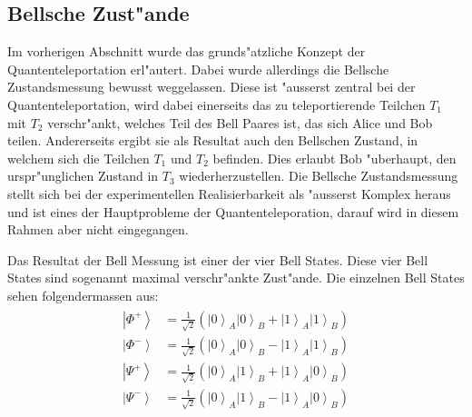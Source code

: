 \begin{refsection}
\subsection{Bellsche Zust"ande}\label{sec:bell-states}
Im vorherigen Abschnitt wurde das grunds"atzliche Konzept der Quantenteleportation erl"autert. Dabei wurde allerdings die Bellsche Zustandsmessung bewusst weggelassen. Diese ist "ausserst zentral bei der Quantenteleportation, wird dabei einerseits das zu teleportierende Teilchen $T_{1}$ mit $T_{2}$ verschr"ankt, welches Teil des Bell Paares ist, das sich Alice und Bob teilen. Andererseits ergibt sie als Resultat auch den Bellschen Zustand, in welchem sich die Teilchen $T_{1}$ und $T_{2}$ befinden. Dies erlaubt Bob "uberhaupt, den urspr"unglichen Zustand in $T_{3}$ wiederherzustellen. Die Bellsche Zustandsmessung stellt sich bei der experimentellen Realisierbarkeit als "ausserst Komplex heraus und ist eines der Hauptprobleme der Quantenteleporation, darauf wird in diesem Rahmen aber nicht eingegangen.

Das Resultat der Bell Messung ist einer der vier Bell States. Diese vier Bell States sind sogenannt maximal verschr"ankte Zust"ande. Die einzelnen Bell States sehen folgendermassen aus:
\begin{align}
	\begin{split}
\left|\Phi^+\right\rangle & = \frac{1}{\sqrt{2}}(\left|0\right\rangle_{A}\left|0\right\rangle_{B} + \left|1\right\rangle_{A}\left|1\right\rangle_{B}) \\
\left|\Phi^-\right\rangle & = \frac{1}{\sqrt{2}}(\left|0\right\rangle_{A}\left|0\right\rangle_{B} - \left|1\right\rangle_{A}\left|1\right\rangle_{B}) \\
\left|\Psi^+\right\rangle & = \frac{1}{\sqrt{2}}(\left|0\right\rangle_{A}\left|1\right\rangle_{B} + \left|1\right\rangle_{A}\left|0\right\rangle_{B}) \\
\left|\Psi^-\right\rangle & = \frac{1}{\sqrt{2}}(\left|0\right\rangle_{A}\left|1\right\rangle_{B} - \left|1\right\rangle_{A}\left|0\right\rangle_{B}) 
	\end{split}
\end{align}


\end{refsection}
